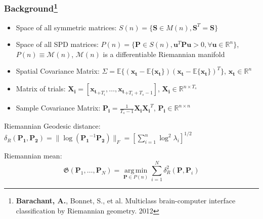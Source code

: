 \documentclass{beamer}
\newcommand\blfootnote[1]{%
	\begingroup
	\renewcommand\thefootnote{}\footnote{#1}%
	\addtocounter{footnote}{-1}%
	\endgroup
}
\begin{document}
\begin{frame}
\frametitle{Background\footnote{\tiny{\textbf{Barachant, A.}, Bonnet, S., et al. Multiclass brain-computer interface classification by Riemannian geometry. 2012}}}
\begin{itemize}
\item Space of all symmetric matrices: $S(n) = \{\mathbf{S} \in M(n), \mathbf{S}^T = \mathbf{S}\}$

\item Space of all SPD matrices: $P(n) = \{\mathbf{P} \in S(n), \mathbf{u}^T\mathbf{P}\mathbf{u} > 0, \forall \mathbf{u} \in \mathbb{R}^n\}$, $P(n) \equiv \mathcal{M}(n)$, $\mathcal{M}(n)$ is a differentiable Riemannian manifold

\item Spatial Covariance Matrix: $\Sigma = \mathbb{E}\{(\mathbf{x_t} -\mathbb{E}\{\mathbf{x_t}\})(\mathbf{x_t} -\mathbb{E}\{\mathbf{x_t}\})^T\}$, $\mathbf{x_t} \in \mathbb{R}^n$

\item Matrix of trials: $\mathbf{X_i} = [\mathbf{x_{t}}_{+T_i}, \dots, \mathbf{x_{t}}_{+T_i+T_s-1}]$, $\mathbf{X_i} \in \mathbb{R}^{n \times T_s}$

\item Sample Covariance Matrix: $\mathbf{P_i} = \frac{1}{T_s - 1} \mathbf{X_i} \mathbf{X_i}^{T}$, $\mathbf{P_i} \in \mathbb{R}^{n \times n}$
\end{itemize}

Riemannian Geodesic distance: $\delta_R(\mathbf{P_1}, \mathbf{P_2}) = \lVert \log (\mathbf{P_1}^{-1} \mathbf{P_2})\rVert_F = \left[\sum\limits_{i=1}^n \log^2 \lambda_i\right]^{1/2}$


Riemannian mean: 
$$\mathfrak{G}(\mathbf{P}_1, \dots, \mathbf{P}_N) = \operatorname*{arg\,min}_{\mathbf{P} \in P(n)} \sum\limits_{i=1}^{N}{\delta^2_R(\mathbf{P}, \mathbf{P}_i)}$$

\end{frame}

\end{document}
